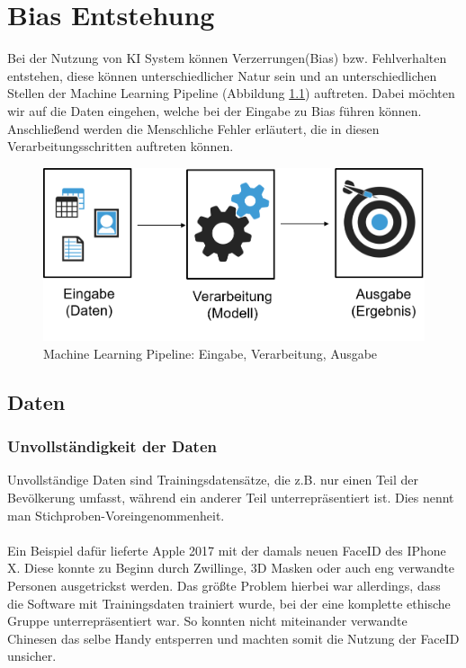 \documentclass[12pt,oneside,a4paper,parskip]{scrbook}
\begin{document}
\chapter{Bias Entstehung}
\label{chapter:BiasEntstehung}
Bei der Nutzung von KI System können Verzerrungen(Bias) bzw. Fehlverhalten entstehen, diese können unterschiedlicher Natur sein und an unterschiedlichen Stellen der Machine Learning Pipeline (Abbildung \ref{fig:dataBias}) auftreten. Dabei möchten wir auf die Daten eingehen, welche bei der Eingabe zu Bias führen können. Anschließend werden die Menschliche Fehler erläutert, die in diesen Verarbeitungsschritten auftreten können.

\begin{figure}[h]
	\begin{center}
		\includegraphics[width=12cm]{Bilder/data_bias.png}
		\caption{Machine Learning Pipeline: Eingabe, Verarbeitung, Ausgabe}
		\label{fig:dataBias}
	\end{center}
\end{figure}

\section{Daten}
\label{section:data}
\subsection{Unvollständigkeit der Daten}
\label{section:uncompleteData}
Unvollständige Daten sind Trainingsdatensätze, die z.B. nur einen Teil der Bevölkerung umfasst, während ein anderer Teil unterrepräsentiert ist. Dies nennt man Stichproben-Voreingenommenheit.
\\\\
Ein Beispiel dafür lieferte Apple 2017 mit der damals neuen FaceID des IPhone X.
Diese konnte zu Beginn durch Zwillinge, 3D Masken oder auch eng verwandte Personen ausgetrickst werden. Das größte Problem hierbei war allerdings, dass die Software mit Trainingsdaten trainiert wurde, bei der eine komplette ethische Gruppe unterrepräsentiert war. So konnten nicht miteinander verwandte Chinesen das selbe Handy entsperren und machten somit die Nutzung der FaceID unsicher\cite{iphone}.
\end{document}
